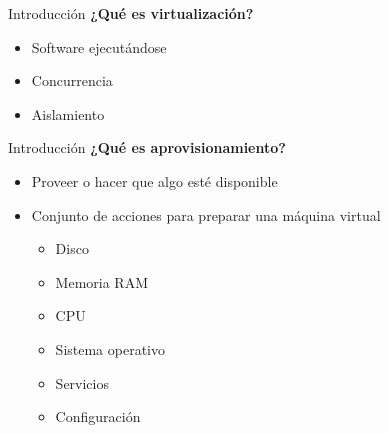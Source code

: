 \begin{frame}{Introducción}
    \vspace{0cm}
    \textbf{¿Qué es virtualización?}
    \begin{itemize}
        \item Software ejecutándose
        \item Concurrencia
        \item Aislamiento
    \end{itemize}



\end{frame}

\begin{frame}{Introducción}
    \vspace{0cm}
    \textbf{¿Qué es aprovisionamiento?}
    \begin{itemize}
        \item Proveer o hacer que algo esté disponible
        \item Conjunto de acciones para preparar una máquina virtual
        \begin{itemize}
            \item Disco
            \item Memoria RAM
            \item CPU
            \item Sistema operativo
            \item Servicios
            \item Configuración
        \end{itemize}
    \end{itemize}


\end{frame}

